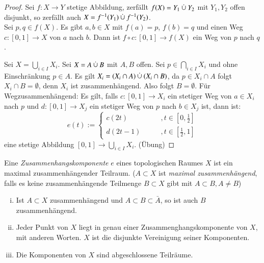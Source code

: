 \documentclass[a4paper,10pt]{scrartcl}
\begin{document}
\begin{proof}
\item Sei $ f:X\to Y$ stetige Abbildung, zerfällt $f(X)=Y_1\mathbin{\dot{\cup}} Y_2$ mit $Y_1, Y_2$ offen disjunkt, so zerfällt auch $ X=f^{-1}(Y_1)\mathbin{\dot{\cup}} f^{-1}(Y_2) $. \\
\fixme[fig23]
Sei $ p,q \in f(X) $. Es gibt $ a,b\in X $ mit $ f(a)=p $, $ f(b)=q $ und einen Weg $ c:[0,1]\to X $ von $ a $ nach $ b $. Dann ist $ f\circ c:[0,1]\to f(X) $ ein Weg von $ p $ nach $ q $.
\item Sei $ X=\bigcup_{i\in I}X_i $. Sei $ X=A\mathbin{\dot{\cup}} B $ mit $ A,B $ offen. Sei $ p\in \bigcap_{i\in I}X_i $ und ohne Einschränkung $ p\in A $.  Es gilt $ X_i=(X_i\cap A)\mathbin{\dot{\cup}} (X_i\cap B) $, da $ p\in X_i\cap A $ folgt $ X_i\cap B=\emptyset $, denn $ X_i $ ist zusammenhängend. Also folgt $ B=\emptyset $.
Für Wegzusammenhängend:
\fixme[fig24]
Es gilt, falls $ c:[0,1]\to X_i $ ein stetiger Weg von $ a\in X_i $ nach $ p $ und $ d:[0,1]\to X_j $ ein stetiger Weg von $ p $ nach $ b\in X_j $ ist, dann ist:
\[
e(t):=\begin{cases}c(2t)\qquad &,t\in[0,\frac 1 2]\\ d(2t-1)\qquad &,t\in[\frac 1 2, 1]\end{cases}
\]
eine stetige Abbildung $ [0,1]\to \bigcup_{i\in I}X_i $. (Übung)
\end{proof}
\begin{df}
 Eine \emph{Zusammenhangskomponente} $e$ eines topologischen Raumes $X$ ist ein maximal zusammenhängender Teilraum.
($A\subset X$ ist \emph{maximal zusammenhängend}, falls es keine zusammenhängende Teilmenge $B\subset X$ gibt mit $A\subset B, A\neq B$)
\end{df}
\begin{st}\label{thm:4.4}
 \begin{enumerate}[(i)]
  \item Ist $A\subset X$ zusammenhängend und $A\subset B\subset \bar A$, so ist auch $B$ zusammenhängend.
  \item Jeder Punkt von $X$ liegt in genau einer Zusammenghangskomponente von $X$, mit anderen Worten. $X$ ist die disjunkte Vereinigung seiner Komponenten.
\item Die Komponenten von $X$ sind abgeschlossene Teilräume.
 \end{enumerate}

\end{st}
\end{document}
